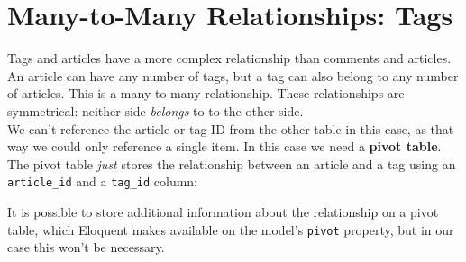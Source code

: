 \section{Many-to-Many Relationships: Tags}

Tags and articles have a more complex relationship than comments and articles. An article can have any number of tags, but a tag can also belong to any number of articles. This is a many-to-many relationship. These relationships are symmetrical: neither side \textit{belongs} to to the other side.
\\

We can't reference the article or tag ID from the other table in this case, as that way we could only reference a single item. In this case we need a \textbf{pivot table}. The pivot table \textit{just} stores the relationship between an article and a tag using an \texttt{article\_id} and a \texttt{tag\_id} column:


It is possible to store additional information about the relationship on a pivot table, which Eloquent makes available on the model's \texttt{pivot} property, but in our case this won't be necessary.


